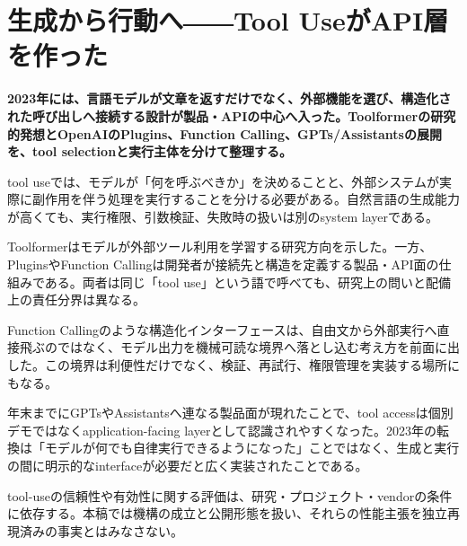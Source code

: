 \section{生成から行動へ――Tool UseがAPI層を作った}
\noindent\textbf{2023年には、言語モデルが文章を返すだけでなく、外部機能を選び、構造化された呼び出しへ接続する設計が製品・APIの中心へ入った。Toolformerの研究的発想とOpenAIのPlugins、Function Calling、GPTs/Assistantsの展開を、tool selectionと実行主体を分けて整理する。}\autocite{src-150e07b331df,src-4de1cea0a896,src-6b76b870b4ae,src-97786632d087,src-e17d0bf10781}

tool useでは、モデルが「何を呼ぶべきか」を決めることと、外部システムが実際に副作用を伴う処理を実行することを分ける必要がある。自然言語の生成能力が高くても、実行権限、引数検証、失敗時の扱いは別のsystem layerである。\autocite{src-150e07b331df,src-4de1cea0a896,src-6b76b870b4ae,src-97786632d087,src-e17d0bf10781}


Toolformerはモデルが外部ツール利用を学習する研究方向を示した。一方、PluginsやFunction Callingは開発者が接続先と構造を定義する製品・API面の仕組みである。両者は同じ「tool use」という語で呼べても、研究上の問いと配備上の責任分界は異なる。\autocite{src-150e07b331df,src-4de1cea0a896,src-6b76b870b4ae,src-97786632d087,src-e17d0bf10781}


Function Callingのような構造化インターフェースは、自由文から外部実行へ直接飛ぶのではなく、モデル出力を機械可読な境界へ落とし込む考え方を前面に出した。この境界は利便性だけでなく、検証、再試行、権限管理を実装する場所にもなる。\autocite{src-4de1cea0a896,src-6b76b870b4ae,src-97786632d087,src-e17d0bf10781}


年末までにGPTsやAssistantsへ連なる製品面が現れたことで、tool accessは個別デモではなくapplication-facing layerとして認識されやすくなった。2023年の転換は「モデルが何でも自律実行できるようになった」ことではなく、生成と実行の間に明示的なinterfaceが必要だと広く実装されたことである。\autocite{src-4de1cea0a896,src-6b76b870b4ae,src-97786632d087,src-e17d0bf10781}


\begin{claimboundary}
tool-useの信頼性や有効性に関する評価は、研究・プロジェクト・vendorの条件に依存する。本稿では機構の成立と公開形態を扱い、それらの性能主張を独立再現済みの事実とはみなさない。\autocite{src-4de1cea0a896,src-6b76b870b4ae,src-97786632d087,src-e17d0bf10781}
\end{claimboundary}
